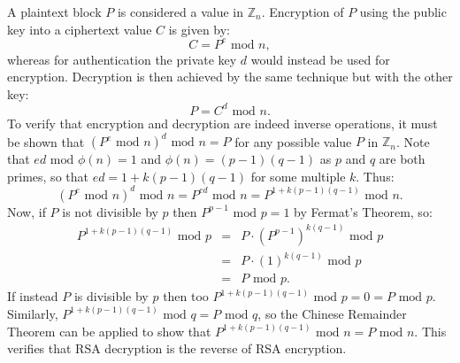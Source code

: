 A plaintext block $P$ is considered a value in $\mathbb{Z}_n$.
Encryption of $P$ using the public key into a ciphertext value $C$ is given by:
\begin{displaymath}
  C = P^e\mbox{ mod }n,
\end{displaymath}
whereas for authentication the private key $d$ would instead be used for encryption.
Decryption is then achieved by the same technique but with the other key:
\begin{displaymath}
  P = C^d\mbox{ mod }n.
\end{displaymath}
To verify that encryption and decryption are indeed inverse operations, it must be
shown that $\left(P^e\mbox{ mod }n\right)^d\mbox{ mod }n=P$
for any possible value $P$ in $\mathbb{Z}_n$.
Note that $ed\mbox{ mod }\phi(n)=1$ and $\phi(n)=(p-1)(q-1)$ as $p$ and $q$ are
both primes, so that $ed=1+k(p-1)(q-1)$ for some multiple $k$. Thus:
\begin{displaymath}
  \left(P^e\mbox{ mod }n\right)^d\mbox{ mod }n
  = P^{ed}\mbox{ mod }n
  = P^{1+k(p-1)(q-1)}\mbox{ mod }n.
\end{displaymath}
Now, if $P$ is not divisible by $p$ then $P^{p-1}\mbox{ mod }p=1$ by Fermat's Theorem, so:
\begin{eqnarray*}
  P^{1+k(p-1)(q-1)}\mbox{ mod }p
  &=& P\cdot\left(P^{p-1}\right)^{k(q-1)}\mbox{ mod }p \\
  &=& P\cdot\left(1\right)^{k(q-1)}\mbox{ mod }p \\
  &=& P\mbox{ mod }p.
\end{eqnarray*}
If instead $P$ is divisible by $p$ then too $P^{1+k(p-1)(q-1)}\mbox{ mod }p=0=P\mbox{ mod }p$.
Similarly, $P^{1+k(p-1)(q-1)}\mbox{ mod }q=P\mbox{ mod }q$, so the Chinese Remainder Theorem
can be applied to show that $P^{1+k(p-1)(q-1)}\mbox{ mod }n=P\mbox{ mod }n$.
This verifies that RSA decryption is the reverse of RSA encryption.

